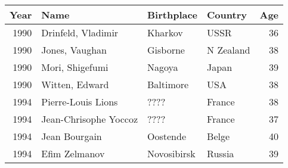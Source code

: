 \begin{tabular}{|r|l|l|l|r|} \hline

{Year} & {Name} & {Birthplace} & {Country}& {Age} 
 \\ \hline

1990&Drinfeld, Vladimir&Kharkov       &USSR     &36\\
1990&Jones, Vaughan    &Gisborne      &N Zealand&38\\
1990&Mori, Shigefumi   &Nagoya        &Japan    &39\\
1990&Witten, Edward    &Baltimore     &USA      &38\\
1994& Pierre-Louis Lions    & ????  &   France  &   38\\
1994&Jean-Chrisophe Yoccoz  &   ????  &   France  &   37\\
1994&Jean Bourgain          &  Oostende  &   Belge   &   40\\
1994&Efim Zelmanov          &   Novosibirsk  &   Russia  &   39\\
\hline
\end{tabular}

\bigskip
\bigskip


